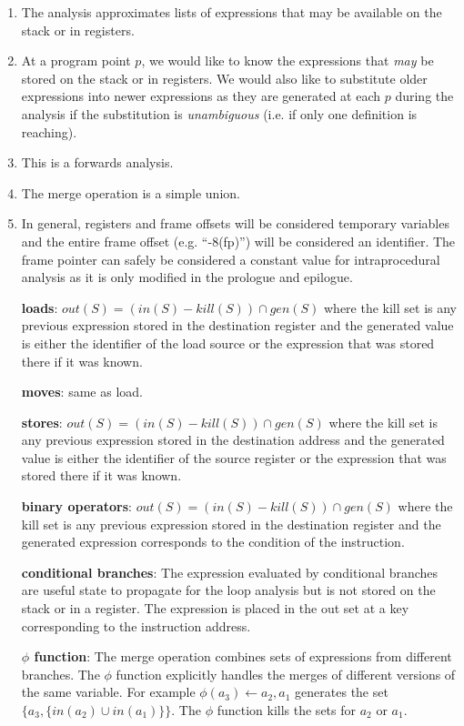 \begin{enumerate}
  \item The analysis approximates lists of expressions that may be available on the stack or in registers.
  \item At a program point $p$, we would like to know the expressions that \textit{may} be stored on the stack or in registers.  We would also like to substitute older expressions into newer expressions as they are generated at each $p$ during the analysis if the substitution is \textit{unambiguous} (i.e. if only one definition is reaching).
  \item This is a forwards analysis.
  \item The merge operation is a simple union. 
  \item In general, registers and frame offsets will be considered temporary variables and the entire frame offset (e.g. ``-8(fp)'') will be considered an identifier. The frame pointer can safely be considered a constant value for intraprocedural analysis as it is only modified in the prologue and epilogue.
   
  \textbf{loads}: $out(S) = (in(S) - kill(S)) \cap gen(S)$ where the kill set is any previous expression stored in the destination register and the generated value is either the identifier of the load source or the expression that was stored there if it was known. 
  
  \textbf{moves}: same as load.
  
  \textbf{stores}: $out(S) = (in(S) - kill(S)) \cap gen(S)$ where the kill set is any previous expression stored in the destination address and the generated value is either the identifier of the source register or the expression that was stored there if it was known.
  
  \textbf{binary operators}: $out(S) = (in(S) - kill(S)) \cap gen(S)$ where the kill set is any previous expression stored in the destination register and the generated expression corresponds to the condition of the instruction.
  
  \textbf{conditional branches}: The expression evaluated by conditional branches are useful state to propagate for the loop analysis but is not stored on the stack or in a register. The expression is placed in the out set at a key corresponding to the instruction address.
  
  \textbf{$\phi$ function}: The merge operation combines sets of expressions from different branches. The $\phi$ function explicitly handles the merges of different versions of the same variable. For example $\phi(a_3) \leftarrow a_2,a_1$ generates the set $\{a_3, \{in(a_2) \cup in(a_1)\}\}$. The $\phi$ function kills the sets for $a_2$ or $a_1$.
  

\end{enumerate}
